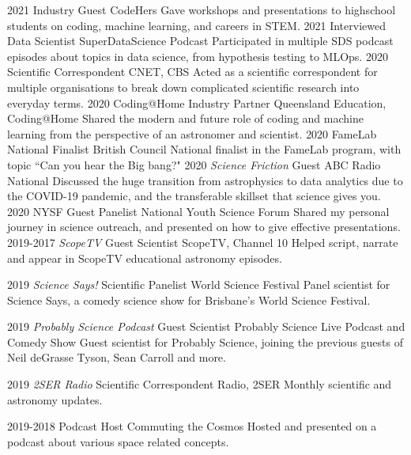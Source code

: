 \begin{entrylist}
\entry
    {2021}
    {Industry Guest}
    {CodeHers}
    {Gave workshops and presentations to highschool students on coding, machine learning, and careers in STEM.}
\entry
    {2021}
    {Interviewed Data Scientist}
    {SuperDataScience Podcast}
    {Participated in multiple SDS podcast episodes about topics in data science, from hypothesis testing to MLOps.}
\entry
    {2020}
    {Scientific Correspondent}
    {CNET, CBS}
    {Acted as a scientific correspondent for multiple organisations to break down complicated scientific research into everyday terms.}
\entry
	{2020}
	{Coding@Home Industry Partner}
	{Queensland Education, Coding@Home}
	{Shared the modern and future role of coding and machine learning from the perspective of an astronomer and scientist.}
\entry
    {2020}
    {FameLab National Finalist}
    {British Council}
    {National finalist in the FameLab program, with topic ``Can you hear the Big bang?"}
\entry
    {2020}
    {\textit{Science Friction} Guest}
    {ABC Radio National}
    {Discussed the huge transition from astrophysics to data analytics due to the COVID-19 pandemic, and the transferable skillset that science gives you.}
\entry
	{2020}
	{NYSF Guest Panelist}
	{National Youth Science Forum}
	{Shared my personal journey in science outreach, and presented on how to give effective presentations.}
\entry
	{2019-2017}
	{\textit{ScopeTV} Guest Scientist}
	{ScopeTV, Channel 10}
	{Helped script, narrate and appear in ScopeTV educational astronomy episodes.}
\end{entrylist}
\begin{entrylist}
\entry
	{2019}
	{\textit{Science Says!} Scientific Panelist}
	{World Science Festival}
	{Panel scientist for Science Says, a comedy science show for Brisbane's World Science Festival.}
\end{entrylist}
\begin{entrylist}
\entry
	{2019}
	{\textit{Probably Science Podcast }Guest Scientist}
	{Probably Science Live Podcast and Comedy Show}
	{Guest scientist for Probably Science, joining the previous guests of Neil deGrasse Tyson, Sean Carroll and more.}
\end{entrylist}
\begin{entrylist}
\entry
	{2019}
	{\textit{2SER Radio} Scientific Correspondent}
	{Radio, 2SER}
	{Monthly scientific and astronomy updates.}
\end{entrylist}
\begin{entrylist}
\entry
    {2019-2018}
    {Podcast Host}
    {Commuting the Cosmos}
    {Hosted and presented on a podcast about various space related concepts.}
\end{entrylist}
